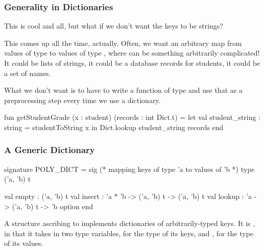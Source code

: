 \documentclass[aspectratio=169]{beamer}
\begin{document}

\begin{frame}[fragile]
  \frametitle{Generality in Dictionaries}

  This is cool and all, but what if we don't want the keys to be strings?

  \pause
  \vspace{\fill}

  This comes up all the time, actually. Often, we want an arbitrary map
  from values of type  to values of type , where
   can be something arbitrarily complicated! It could be lists of
  strings, it could be a database records for students, it could be a set
  of names.

  \pause
  \vspace{\fill}

  What we don't want is to have to write a function of type 
  and use that as a preprocessing step every time we use a dictionary.

  \pause
  \vspace{\fill}

  \begin{codeblock}
    fun getStudentGrade (x : student) (records : int Dict.t) =
      let
        val student_string : string = studentToString x
      in
        Dict.lookup student_string records
      end
  \end{codeblock}
\end{frame}

\begin{frame}[fragile]
  \frametitle{A Generic Dictionary}

  \begin{codeblock}
    signature POLY_DICT =
      sig
        (* mapping keys of type 'a to values of 'b *)
        type ('a, 'b) t

        val empty : ('a, 'b) t
        val insert : 'a * 'b -> ('a, 'b) t -> ('a, 'b) t
        val lookup : 'a -> ('a, 'b) t -> 'b option
      end
  \end{codeblock}

  \pause
  \vspace{\fill}

  A structure ascribing to  implements dictionaries of
  arbitrarily-typed keys. It is , in that it
  takes in two type variables,  for the type of its keys, and
  , for the type of its values.
\end{frame}
\end{document}
